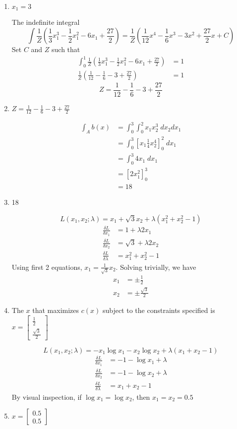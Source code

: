 \documentclass[11pt]{scrartcl}
\begin{document}
\begin{enumerate}
\item $x_1 = 3$

The indefinite integral 
\[\int \frac{1}{Z} \left(\frac{1}{3}x_1^3 - \frac{1}{2}x_1^2 - 6x_1 + \frac{27}{2} \right) = \frac{1}{Z} \left(\frac{1}{12}x^4 - \frac{1}{6}x^3 - 3x^2 + \frac{27}{2}x + C\right)\]
Set $C$ and $Z$ such that 
\begin{align*}
\int^1_0 \frac{1}{Z} \left(\frac{1}{3}x_1^3 - \frac{1}{2}x_1^2 - 6x_1 + \frac{27}{2} \right) &= 1 \\
\frac{1}{Z} \left(\frac{1}{12} - \frac{1}{6} - 3 + \frac{27}{2}\right) &= 1
\end{align*}
\[Z = \frac{1}{12} - \frac{1}{6} - 3 + \frac{27}{2}\]
\item $Z = \frac{1}{12} - \frac{1}{6} - 3 + \frac{27}{2}$

\begin{align*}
\int_A b(x) &= \int^3_0 \int^2_0 x_1 x_2^3 \; dx_2 dx_1 \\
&= \int^3_0 \left[ x_1 \frac{1}{4} x_2^4 \right]^2_0 \; dx_1 \\
&= \int^3_0 4 x_1 \; dx_1 \\
&= \left[ 2 x_1^2 \right]^3_0 \\
&= 18
\end{align*}
\item 18 

\[L(x_1, x_2; \lambda) = x_1 + \sqrt{3}x_2 + \lambda(x_1^2 + x_2^2 - 1)\]
\begin{align*}
\frac{\delta L}{\delta x_1} &= 1 + \lambda 2x_1 \\
\frac{\delta L}{\delta x_2} &= \sqrt{3} + \lambda 2x_2 \\
\frac{\delta L}{\delta \lambda} &= x_1^2 + x_2^2 - 1
\end{align*}
Using first 2 equations, $x_1 = \frac{1}{\sqrt{3}}x_2$. Solving trivially, we have
\begin{align*}
x_1 &= \pm \frac{1}{2}\\
x_2 &= \pm \frac{\sqrt{3}}{2}
\end{align*}
\item The $x$ that maximizes $c(x)$ subject to the constraints specified is $x = \begin{bmatrix} \frac{1}{2} \\ \frac{\sqrt{3}}{2} \end{bmatrix}$

\[L(x_1, x_2; \lambda) = -x_1 \log{x_1} - x_2 \log{x_2} + \lambda (x_1 + x_2 - 1)\]
\begin{align*}
\frac{\delta L}{\delta x_1} &= -1 - \log{x_1} + \lambda\\
\frac{\delta L}{\delta x_2} &= -1 - \log{x_2} + \lambda \\
\frac{\delta L}{\delta \lambda} &= x_1 + x_2 - 1 
\end{align*}
By visual inspection, if $\log x_1 = \log x_2$, then $x_1 = x_2 = 0.5$
\item $x = \begin{bmatrix} 0.5 \\ 0.5 \end{bmatrix}$

\end{enumerate}
\end{document}
